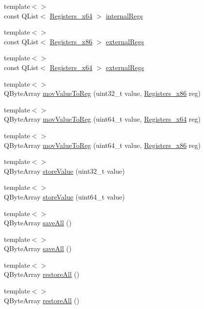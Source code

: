 \begin{DoxyCompactItemize}
\item 
{\footnotesize template$<$$>$ }\\const Q\-List$<$ \hyperlink{codedefines_8h_a5e15b5c4d766f6faf29b5bcec37bde5c}{Registers\-\_\-x64} $>$ \hyperlink{class_code_defines_a0901fe2185ed5ffc391ee5c1e4a14b7a}{internal\-Regs}
\item 
{\footnotesize template$<$$>$ }\\const Q\-List$<$ \hyperlink{codedefines_8h_a0f84efe4ca4d99203713a78bd6e8c82e}{Registers\-\_\-x86} $>$ \hyperlink{class_code_defines_a01f343f93dc3aad78e7b83c1f4881588}{external\-Regs}
\item 
{\footnotesize template$<$$>$ }\\const Q\-List$<$ \hyperlink{codedefines_8h_a5e15b5c4d766f6faf29b5bcec37bde5c}{Registers\-\_\-x64} $>$ \hyperlink{class_code_defines_a3556bec0f430313c92ee805287cbb883}{external\-Regs}
\item 
{\footnotesize template$<$$>$ }\\Q\-Byte\-Array \hyperlink{class_code_defines_aaccf2aa728b76b96a6959ef8bfd03739}{mov\-Value\-To\-Reg} (uint32\-\_\-t value, \hyperlink{codedefines_8h_a0f84efe4ca4d99203713a78bd6e8c82e}{Registers\-\_\-x86} reg)
\item 
{\footnotesize template$<$$>$ }\\Q\-Byte\-Array \hyperlink{class_code_defines_aafe7e312fbb95b53f89435d37cf278fb}{mov\-Value\-To\-Reg} (uint64\-\_\-t value, \hyperlink{codedefines_8h_a5e15b5c4d766f6faf29b5bcec37bde5c}{Registers\-\_\-x64} reg)
\item 
{\footnotesize template$<$$>$ }\\Q\-Byte\-Array \hyperlink{class_code_defines_ae4db2d1e5a428a4c9ec5972a380159de}{mov\-Value\-To\-Reg} (uint64\-\_\-t value, \hyperlink{codedefines_8h_a0f84efe4ca4d99203713a78bd6e8c82e}{Registers\-\_\-x86} reg)
\item 
{\footnotesize template$<$$>$ }\\Q\-Byte\-Array \hyperlink{class_code_defines_a40157c99b0f396b77cd6d7dc8f80071d}{store\-Value} (uint32\-\_\-t value)
\item 
{\footnotesize template$<$$>$ }\\Q\-Byte\-Array \hyperlink{class_code_defines_a964f09310db04f127c7684a8c24ae58e}{store\-Value} (uint64\-\_\-t value)
\item 
{\footnotesize template$<$$>$ }\\Q\-Byte\-Array \hyperlink{class_code_defines_a9258c95f68116611b02378bd60212111}{save\-All} ()
\item 
{\footnotesize template$<$$>$ }\\Q\-Byte\-Array \hyperlink{class_code_defines_aa4e9c15c2613d1d628f7c11f674c46ea}{save\-All} ()
\item 
{\footnotesize template$<$$>$ }\\Q\-Byte\-Array \hyperlink{class_code_defines_ae77aeeb9e9d40dde299fb17ee3cca269}{restore\-All} ()
\item 
{\footnotesize template$<$$>$ }\\Q\-Byte\-Array \hyperlink{class_code_defines_a717d9ab10ffe0caaa17807133894cb06}{restore\-All} ()
\end{DoxyCompactItemize}
